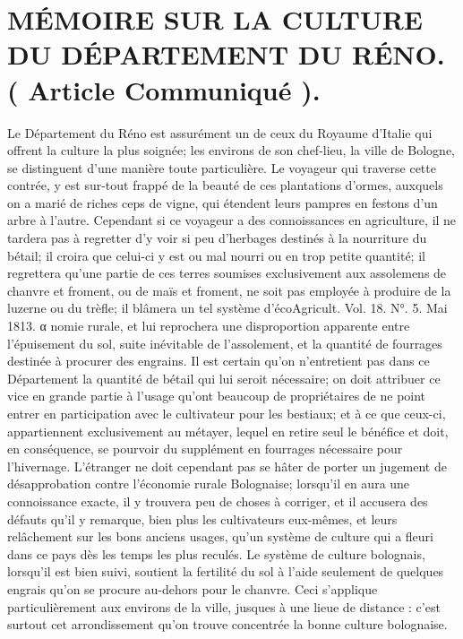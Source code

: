 \setcounter{page}{161} \section{MÉMOIRE SUR LA CULTURE DU DÉPARTEMENT DU RÉNO. ( Article Communiqué ).}
Le Département du Réno est assurément un de ceux du Royaume d'Italie qui offrent la culture la plus soignée; les environs de son chef-lieu, la ville de Bologne, se distinguent d'une manière toute particulière. Le voyageur qui traverse cette contrée, y est sur-tout frappé de la beauté de ces plantations d'ormes, auxquels on a marié de riches ceps de vigne, qui étendent leurs pampres en festons d'un arbre à l'autre. Cependant si ce voyageur a des connoissances en agriculture, il ne tardera pas à regretter d'y voir si peu d'herbages destinés à la nourriture du bétail; il croira que celui-ci y est ou mal nourri ou en trop petite quantité; il regrettera qu'une partie de ces terres soumises exclusivement aux assolemens de chanvre et froment, ou de maïs et froment, ne soit pas employée à produire de la luzerne ou du trèfle; il blâmera un tel système d'écoAgricult. Vol. 18. N°. 5. Mai 1813. α\setcounter{page}{162} nomie rurale, et lui reprochera une disproportion apparente entre l'épuisement du sol, suite inévitable de l'assolement, et la quantité de fourrages destinée à procurer des engrains.
Il est certain qu'on n'entretient pas dans ce Département la quantité de bétail qui lui seroit nécessaire; on doit attribuer ce vice en grande partie à l'usage qu'ont beaucoup de propriétaires de ne point entrer en participation avec le cultivateur pour les bestiaux; et à ce que ceux-ci, appartiennent exclusivement au métayer, lequel en retire seul le bénéfice et doit, en conséquence, se pourvoir du supplément en fourrages nécessaire pour l'hivernage. L'étranger ne doit cependant pas se hâter de porter un jugement de désapprobation contre l'économie rurale Bolognaise; lorsqu'il en aura une connoissance exacte, il y trouvera peu de choses à corriger, et il accusera des défauts qu'il y remarque, bien plus les cultivateurs eux-mêmes, et leurs relâchement sur les bons anciens usages, qu'un système de culture qui a fleuri dans ce pays dès les temps les plus reculés. Le système de culture bolognais, lorsqu'il est bien suivi, soutient la fertilité du sol à l'aide seulement de quelques engrais qu'on se procure au-dehors pour le chanvre.\setcounter{page}{163} Ceci s'applique particulièrement aux environs de la ville, jusques à une lieue de distance : c'est surtout cet arrondissement qu'on trouve concentrée la bonne culture bolognaise.

